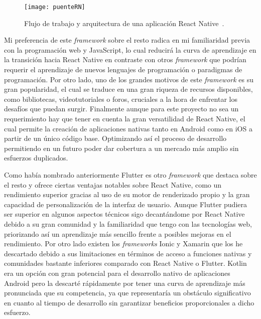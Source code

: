 \begin{figure}[h]
	\centering
	\texttt{[image: puenteRN]}
	\caption[flujo trabajo React Native]{Flujo de trabajo y arquitectura de una aplicación React Native~\cite{RNarquitectura}.}
	\label{fig:puenteRN}
\end{figure}

Mi preferencia de este \textit{framework} sobre el resto radica en mi familiaridad previa con la programación web y JavaScript, lo cual reducirá la curva de aprendizaje en la transición hacia React Native en contraste con otros \textit{framework} que podrían requerir el aprendizaje de nuevos lenguajes de programación o paradigmas de programación. 
Por otro lado, uno de los grandes motivos de este \textit{framework} es su gran popularidad, el cual se traduce en una gran riqueza de recursos disponibles, como bibliotecas, videotutoriales o foros, cruciales a la hora de enfrentar los desafíos que puedan surgir. 
Finalmente aunque para este proyecto no sea un requerimiento hay que tener en cuenta la gran versatilidad de React Native, el cual permite la creación de aplicaciones nativas tanto en Android como en iOS a partir de un único código base. Optimizando así el proceso de desarrollo permitiendo en un futuro poder dar cobertura a un mercado más amplio sin esfuerzos duplicados.

Como había nombrado anteriormente Flutter es otro \textit{framework} que destaca sobre el resto y ofrece ciertas ventajas notables sobre React Native, como un rendimiento superior gracias al uso de su motor de renderizado propio y la gran capacidad de personalización de la interfaz de usuario. Aunque Flutter pudiera ser superior en algunos aspectos técnicos sigo decantándome por React Native debido a su gran comunidad y la familiaridad que tengo con las tecnologías web, priorizando así un aprendizaje más sencillo frente a posibles mejoras en el rendimiento. Por otro lado existen los \textit{frameworks} Ionic y Xamarin que los he descartado debido a sus limitaciones en términos de acceso a funciones nativas y comunidades bastante inferiores comparado con React Native o Flutter. Kotlin era un opción con gran potencial para el desarrollo nativo de aplicaciones Android pero la descarté rápidamente por tener una curva de aprendizaje más pronunciada que su competencia, ya que representaría un obstáculo significativo en cuanto al tiempo de desarrollo sin garantizar beneficios proporcionales a dicho esfuerzo.


